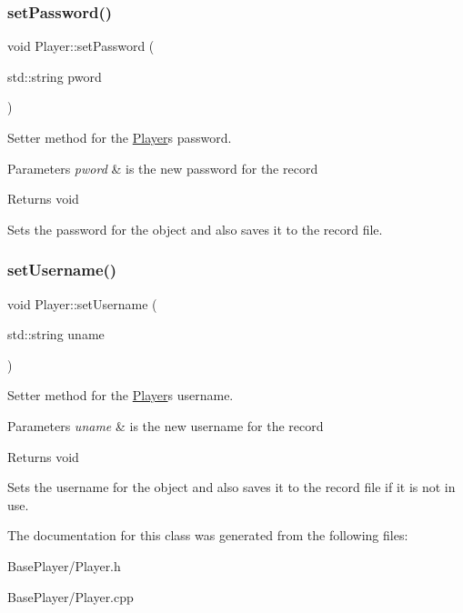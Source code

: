 \subsubsection{\texorpdfstring{set\+Password()}{setPassword()}}
{\footnotesize\ttfamily void Player\+::set\+Password (\begin{DoxyParamCaption}\item[{std\+::string}]{pword }\end{DoxyParamCaption})}



Setter method for the \hyperlink{classPlayer}{Player}\textquotesingle{}s password. 


\begin{DoxyParams}{Parameters}
{\em pword} & is the new password for the record \\
\hline
\end{DoxyParams}
\begin{DoxyReturn}{Returns}
void
\end{DoxyReturn}
Sets the password for the object and also saves it to the record file. \mbox{\label{classPlayer_a8fc488bcda5714ae92466d2936380787}} 
\subsubsection{\texorpdfstring{set\+Username()}{setUsername()}}
{\footnotesize\ttfamily void Player\+::set\+Username (\begin{DoxyParamCaption}\item[{std\+::string}]{uname }\end{DoxyParamCaption})}



Setter method for the \hyperlink{classPlayer}{Player}\textquotesingle{}s username. 


\begin{DoxyParams}{Parameters}
{\em uname} & is the new username for the record \\
\hline
\end{DoxyParams}
\begin{DoxyReturn}{Returns}
void
\end{DoxyReturn}
Sets the username for the object and also saves it to the record file if it is not in use. 

The documentation for this class was generated from the following files\+:\begin{DoxyCompactItemize}
\item 
Base\+Player/Player.\+h\item 
Base\+Player/Player.\+cpp\end{DoxyCompactItemize}
